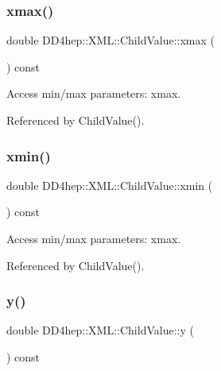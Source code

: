 \subsubsection{\texorpdfstring{xmax()}{xmax()}}
{\footnotesize\ttfamily double D\+D4hep\+::\+X\+M\+L\+::\+Child\+Value\+::xmax (\begin{DoxyParamCaption}{ }\end{DoxyParamCaption}) const}



Access min/max parameters\+: xmax. 



Referenced by Child\+Value().

\hypertarget{struct_d_d4hep_1_1_x_m_l_1_1_child_value_a39702751aae67ff2b9bce0aab83cd1a3}{}\label{struct_d_d4hep_1_1_x_m_l_1_1_child_value_a39702751aae67ff2b9bce0aab83cd1a3} 
\subsubsection{\texorpdfstring{xmin()}{xmin()}}
{\footnotesize\ttfamily double D\+D4hep\+::\+X\+M\+L\+::\+Child\+Value\+::xmin (\begin{DoxyParamCaption}{ }\end{DoxyParamCaption}) const}



Access min/max parameters\+: xmax. 



Referenced by Child\+Value().

\hypertarget{struct_d_d4hep_1_1_x_m_l_1_1_child_value_a5acc075a40e7740d6f8b3904eba9ab32}{}\label{struct_d_d4hep_1_1_x_m_l_1_1_child_value_a5acc075a40e7740d6f8b3904eba9ab32} 
\subsubsection{\texorpdfstring{y()}{y()}\hspace{0.1cm}{\footnotesize\ttfamily [1/2]}}
{\footnotesize\ttfamily double D\+D4hep\+::\+X\+M\+L\+::\+Child\+Value\+::y (\begin{DoxyParamCaption}{ }\end{DoxyParamCaption}) const}



